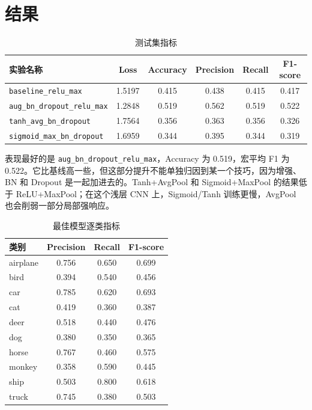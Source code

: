\documentclass[a4paper,11pt]{article}
\begin{document}
\section{结果}

\begin{table}[H]
\centering
\caption{测试集指标}
\small
\begin{tabular}{lccccc}
\toprule
实验名称 & Loss & Accuracy & Precision & Recall & F1-score\\
\midrule
\texttt{baseline\_relu\_max} & 1.5197 & 0.415 & 0.438 & 0.415 & 0.417\\
\texttt{aug\_bn\_dropout\_relu\_max} & 1.2848 & 0.519 & 0.562 & 0.519 & 0.522\\
\texttt{tanh\_avg\_bn\_dropout} & 1.7564 & 0.356 & 0.363 & 0.356 & 0.326\\
\texttt{sigmoid\_max\_bn\_dropout} & 1.6959 & 0.344 & 0.395 & 0.344 & 0.319\\
\bottomrule
\end{tabular}
\end{table}

表现最好的是 \texttt{aug\_bn\_dropout\_relu\_max}，Accuracy 为 0.519，宏平均 F1 为 0.522。它比基线高一些，但这部分提升不能单独归因到某一个技巧，因为增强、BN 和 Dropout 是一起加进去的。Tanh+AvgPool 和 Sigmoid+MaxPool 的结果低于 ReLU+MaxPool；在这个浅层 CNN 上，Sigmoid/Tanh 训练更慢，AvgPool 也会削弱一部分局部强响应。

\begin{table}[H]
\centering
\caption{最佳模型逐类指标}
\small
\begin{tabular}{lccc}
\toprule
类别 & Precision & Recall & F1-score\\
\midrule
airplane & 0.756 & 0.650 & 0.699\\
bird & 0.394 & 0.540 & 0.456\\
car & 0.785 & 0.620 & 0.693\\
cat & 0.419 & 0.360 & 0.387\\
deer & 0.518 & 0.440 & 0.476\\
dog & 0.380 & 0.350 & 0.365\\
horse & 0.767 & 0.460 & 0.575\\
monkey & 0.358 & 0.590 & 0.445\\
ship & 0.503 & 0.800 & 0.618\\
truck & 0.745 & 0.380 & 0.503\\
\bottomrule
\end{tabular}
\end{table}
\end{document}
